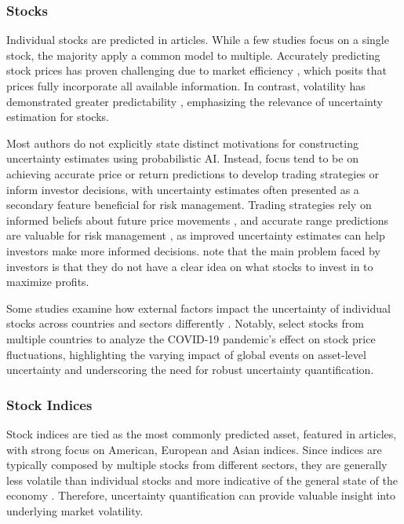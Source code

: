 \subsubsection{Stocks}
Individual stocks are predicted in \stockarticles articles. While a few studies focus on a single stock, the majority apply a common model to multiple. Accurately predicting stock prices has proven challenging due to market efficiency \parencite{fama1970efficient}, which posits that prices fully incorporate all available information. In contrast, volatility has demonstrated greater predictability \parencite{poon2003forecasting}, emphasizing the relevance of uncertainty estimation for stocks. 

Most authors do not explicitly state distinct motivations for constructing uncertainty estimates using probabilistic AI. Instead, focus tend to be on achieving accurate price or return predictions to develop trading strategies or inform investor decisions, with uncertainty estimates often presented as a secondary feature beneficial for risk management. Trading strategies rely on informed beliefs about future price movements \parencite{vuletic2024finGAN}, and accurate range predictions are valuable for risk management \parencite{Li2024DeepAR}, as improved uncertainty estimates can help investors make more informed decisions. \textcite{govindasamy2014prediction} note that the main problem faced by investors is that they do not have a clear idea on what stocks to invest in to maximize profits.  

Some studies examine how external factors impact the uncertainty of individual stocks across countries and sectors differently \parencite{chandra2021bayesian, soleymani2022longterm}. Notably, \textcite{chandra2021bayesian} select stocks from multiple countries to analyze the COVID-19 pandemic's effect on stock price fluctuations, highlighting the varying impact of global events on asset-level uncertainty and underscoring the need for robust uncertainty quantification. 

\subsubsection{Stock Indices}
Stock indices are tied as the most commonly predicted asset, featured in \stockindexarticles articles, with strong focus on American, European and Asian indices. Since indices are typically composed by multiple stocks from different sectors, they are generally less volatile than individual stocks and more indicative of the general state of the economy \parencite{sezer2020financial}. Therefore, uncertainty quantification can provide valuable insight into underlying market volatility. 

